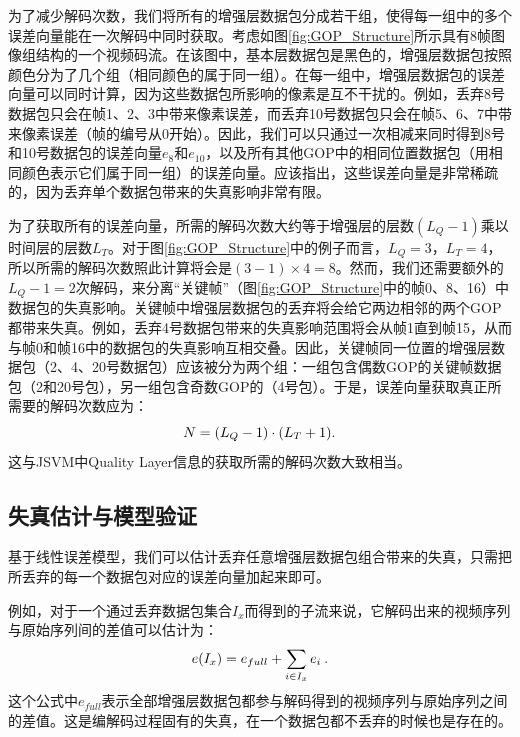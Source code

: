 为了减少解码次数，我们将所有的增强层数据包分成若干组，使得每一组中的多个误差向量能在一次解码中同时获取。考虑如图\ref{fig:GOP_Structure}所示具有8帧图像组结构的一个视频码流。在该图中，基本层数据包是黑色的，增强层数据包按照颜色分为了几个组（相同颜色的属于同一组）。在每一组中，增强层数据包的误差向量可以同时计算，因为这些数据包所影响的像素是互不干扰的。例如，丢弃8号数据包只会在帧1、2、3中带来像素误差，而丢弃10号数据包只会在帧5、6、7中带来像素误差（帧的编号从0开始）。因此，我们可以只通过一次相减来同时得到8号和10号数据包的误差向量$e_{8}$和$e_{10}$，以及所有其他GOP中的相同位置数据包（用相同颜色表示它们属于同一组）的误差向量。应该指出，这些误差向量是非常稀疏的，因为丢弃单个数据包带来的失真影响非常有限。

为了获取所有的误差向量，所需的解码次数大约等于增强层的层数$(L_Q - 1)$乘以时间层的层数$L_T$。对于图\ref{fig:GOP_Structure}中的例子而言，$L_Q = 3$，$L_T = 4$，所以所需的解码次数照此计算将会是$(3 - 1) \times 4 = 8$。然而，我们还需要额外的$L_Q - 1 = 2$次解码，来分离“关键帧”\supercite{H.264-Overview}（图\ref{fig:GOP_Structure}中的帧0、8、16）中数据包的失真影响。关键帧中增强层数据包的丢弃将会给它两边相邻的两个GOP都带来失真。例如，丢弃4号数据包带来的失真影响范围将会从帧1直到帧15，从而与帧0和帧16中的数据包的失真影响互相交叠。因此，关键帧同一位置的增强层数据包（2、4、20号数据包）应该被分为两个组：一组包含偶数GOP的关键帧数据包（2和20号包），另一组包含奇数GOP的（4号包）。于是，误差向量获取真正所需要的解码次数应为：
\begin{equation}
\vspace{10pt}
N = (L_Q - 1) \cdot (L_T + 1).
\end{equation}
这与JSVM中Quality Layer信息的获取所需的解码次数大致相当。

\subsection{失真估计与模型验证}
\vspace{10pt}
\label{subsec:distortion-estimation}

基于线性误差模型，我们可以估计丢弃任意增强层数据包组合带来的失真，只需把所丢弃的每一个数据包对应的误差向量加起来即可。

例如，对于一个通过丢弃数据包集合$I_x$而得到的子流来说，它解码出来的视频序列与原始序列间的差值可以估计为：
\begin{equation}
\vspace{10pt}
\label{eq:subset_error}
e(I_x) = e_{full} + \sum_{i \in {I_x}} e_i \: .
\end{equation}
这个公式中$e_{full}$表示全部增强层数据包都参与解码得到的视频序列与原始序列之间的差值。这是编解码过程固有的失真，在一个数据包都不丢弃的时候也是存在的。

